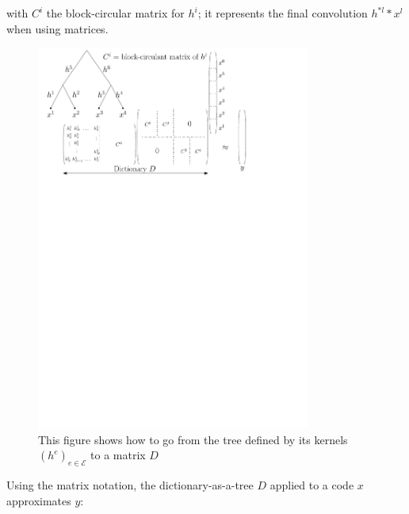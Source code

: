 with $C^i$ the block-circular matrix for $h^i$; it represents the final convolution $h^{*l}*x^l$ when using matrices.


\begin{figure}[!ht] \centering
	\includegraphics[width=0.8\textwidth]{figures/block-circular-matrix.pdf}
	\caption{This figure shows how to go from the tree defined by its kernels $(h^e)_{e \in \mathcal{E}}$ to a matrix $D$} \label{fig_block_circular}
\end{figure}


Using the matrix notation, the dictionary-as-a-tree $D$ applied to a code $x$ approximates $y$:


